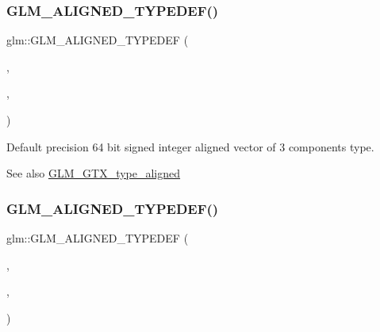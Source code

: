 \subsubsection{\texorpdfstring{G\+L\+M\+\_\+\+A\+L\+I\+G\+N\+E\+D\+\_\+\+T\+Y\+P\+E\+D\+E\+F()}{GLM\_ALIGNED\_TYPEDEF()}\hspace{0.1cm}{\footnotesize\ttfamily [67/209]}}
{\footnotesize\ttfamily glm\+::\+G\+L\+M\+\_\+\+A\+L\+I\+G\+N\+E\+D\+\_\+\+T\+Y\+P\+E\+D\+EF (\begin{DoxyParamCaption}\item[{\hyperlink{group__gtc__type__precision_ga189eb8d6a197bc491cabb6e1f120ecf4}{i64vec3}}]{,  }\item[{aligned\+\_\+i64vec3}]{,  }\item[{32}]{ }\end{DoxyParamCaption})}

Default precision 64 bit signed integer aligned vector of 3 components type. \begin{DoxySeeAlso}{See also}
\hyperlink{group__gtx__type__aligned}{G\+L\+M\+\_\+\+G\+T\+X\+\_\+type\+\_\+aligned} 
\end{DoxySeeAlso}
\mbox{\label{group__gtx__type__aligned_ga716f8ea809bdb11b5b542d8b71aeb04f}} 
\subsubsection{\texorpdfstring{G\+L\+M\+\_\+\+A\+L\+I\+G\+N\+E\+D\+\_\+\+T\+Y\+P\+E\+D\+E\+F()}{GLM\_ALIGNED\_TYPEDEF()}\hspace{0.1cm}{\footnotesize\ttfamily [68/209]}}
{\footnotesize\ttfamily glm\+::\+G\+L\+M\+\_\+\+A\+L\+I\+G\+N\+E\+D\+\_\+\+T\+Y\+P\+E\+D\+EF (\begin{DoxyParamCaption}\item[{\hyperlink{group__gtc__type__precision_gade5e969a6155752095d2cd603bda9408}{i64vec4}}]{,  }\item[{aligned\+\_\+i64vec4}]{,  }\item[{32}]{ }\end{DoxyParamCaption})}

